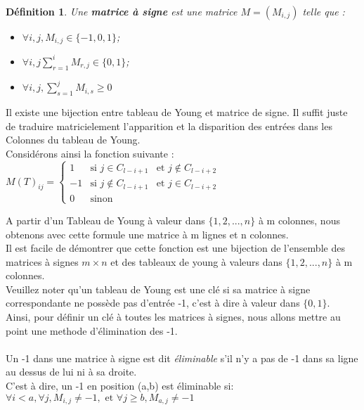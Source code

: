 \documentclass{book}
\newtheorem{petit_nom2}{Définition}[chapter]
\begin{document}
\begin{petit_nom2}
Une \textbf{matrice à signe} est une matrice $M = (M_{i,j})$ telle que : \\
\begin{itemize}
\item $ \forall i, j, M_{i,j} \in \{-1,0,1\}$;
\item $\forall i, j \sum_{r=1}^i M_{r,j} \in \{0,1\}$;
\item $ \forall i, j, \sum_{s=1}^j M_{i,s} \geq 0 $
\end{itemize}
\end{petit_nom2}
Il existe une bijection entre tableau de Young et matrice de signe. Il suffit juste de traduire matricielement l'apparition et la disparition des entrées dans les Colonnes du tableau de Young. \\
Considérons ainsi la fonction suivante : \\

$
M(T)_{ij} = \left\{
    \begin{array}{clclc}
        1 & \mbox{si } j \in C_{l-i+1} & \mbox{et } j \notin  C_{l-i+2} \\
        -1 & \mbox{si } j \notin C_{l-i+1} & \mbox{et } j \in  C_{l-i+2} \\
        0 & \mbox{sinon }
    \end{array}
\right.
$

A partir d'un Tableau de Young à valeur dans $\{1,2,...,n\}$ à m colonnes, nous obtenons avec cette formule une matrice à m lignes et n colonnes.\\
Il est facile de démontrer que cette fonction est une bijection de l'ensemble des matrices  à signes $m \times n$ et des tableaux de young à valeurs dans $\{1,2,...,n\}$ à m colonnes.\\
Veuillez noter qu'un tableau de Young est une clé si sa matrice à signe correspondante ne possède pas d'entrée -1, c'est à dire à valeur dans $\{0,1\}$.\\

Ainsi, pour définir un clé à toutes les matrices à signes, nous allons mettre au point une methode d'élimination des -1. \\\\

Un -1 dans une matrice à signe est dit \textit{éliminable} s'il n'y a pas de -1 dans sa ligne au dessus de lui ni à sa droite. \\ 
C'est à dire, un -1 en position (a,b) est éliminable si: \\
$\forall i < a, \forall j, M_{i,j} \ne -1,  \mbox{ et } \forall j \ge b, M_{a,j} \ne -1$
\end{document}
